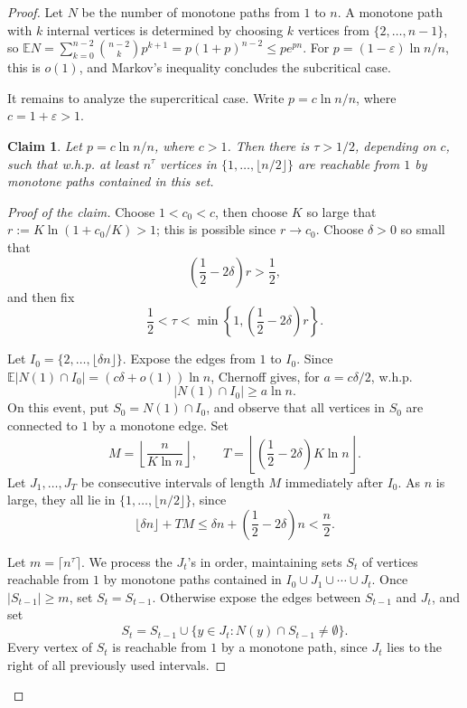 \documentclass[fullpage,11pt]{article}
\newcommand{\EE}{\mathbb{E}}
\theoremstyle{break}
\newtheorem{claim}[theorem]{Claim}
\theoremstyle{definition}
\theoremstyle{break}
\begin{document}
\begin{proof}
Let \(N\) be the number of monotone paths from \(1\) to \(n\). A monotone path
with \(k\) internal vertices is determined by choosing \(k\) vertices from
\(\{2,\ldots,n-1\}\), so
\(\EE N=\sum_{k=0}^{n-2}\binom{n-2}{k}p^{k+1}=p(1+p)^{n-2}\le p e^{pn}\).
For \(p=(1-\varepsilon)\ln n/n\), this is \(o(1)\), and Markov's inequality
concludes the subcritical case.

\noindent It remains to analyze the supercritical case.
Write \(p=c\ln n/n\), where \(c=1+\varepsilon>1\).

\begin{claim}\label{clm:one-sided-growth}
Let \(p=c\ln n/n\), where \(c>1\). Then there is \(\tau>1/2\), depending
on \(c\), such that w.h.p. at least \(n^\tau\) vertices in
\(\{1,\ldots,\lfloor n/2\rfloor\}\) are reachable from \(1\) by monotone paths
contained in this set.
\end{claim}

\begin{proof}[Proof of the claim]
Choose \(1<c_0<c\), then choose \(K\) so large that
\(r:=K\ln(1+c_0/K)>1\); this is possible since \(r\to c_0\). Choose
\(\delta>0\) so small that
\[
    \left(\frac12-2\delta\right)r>\frac12,
\]
and then fix
\[
    \frac12<\tau<\min\left\{1,\left(\frac12-2\delta\right)r\right\}.
\]

Let \(I_0=\{2,\ldots,\lfloor\delta n\rfloor\}\). Expose the edges from \(1\) to
\(I_0\). Since \(\EE |N(1)\cap I_0|=(c\delta+o(1))\ln n\), Chernoff gives,
for \(a=c\delta/2\), w.h.p.
\[
    |N(1)\cap I_0|\ge a\ln n .
\]
On this event, put \(S_0=N(1)\cap I_0\), and observe that all vertices in
\(S_0\) are connected to \(1\) by a monotone edge. Set
\[
    M=\left\lfloor \frac{n}{K\ln n}\right\rfloor,
    \qquad
    T=\left\lfloor\left(\frac12-2\delta\right)K\ln n\right\rfloor .
\]
Let \(J_1,\ldots,J_T\) be consecutive intervals of length \(M\) immediately
after \(I_0\). As \(n\) is large, they all lie in
\(\{1,\ldots,\lfloor n/2\rfloor\}\), since
\[
    \lfloor\delta n\rfloor+TM
    \le \delta n+\left(\frac12-2\delta\right)n
    <\frac n2 .
\]

Let \(m=\lceil n^\tau\rceil\). We process the \(J_t\)'s in order, maintaining
sets \(S_t\) of vertices reachable from \(1\) by monotone paths contained in
\(I_0\cup J_1\cup\cdots\cup J_t\). Once \(|S_{t-1}|\ge m\), set
\(S_t=S_{t-1}\). Otherwise expose the edges between \(S_{t-1}\) and \(J_t\),
and set
\[
    S_t=S_{t-1}\cup\{y\in J_t: N(y)\cap S_{t-1}\ne\emptyset\}.
\]
Every vertex of \(S_t\) is reachable from \(1\) by a monotone path, since
\(J_t\) lies to the right of all previously used intervals.


\end{proof}
\end{proof}
\end{document}
